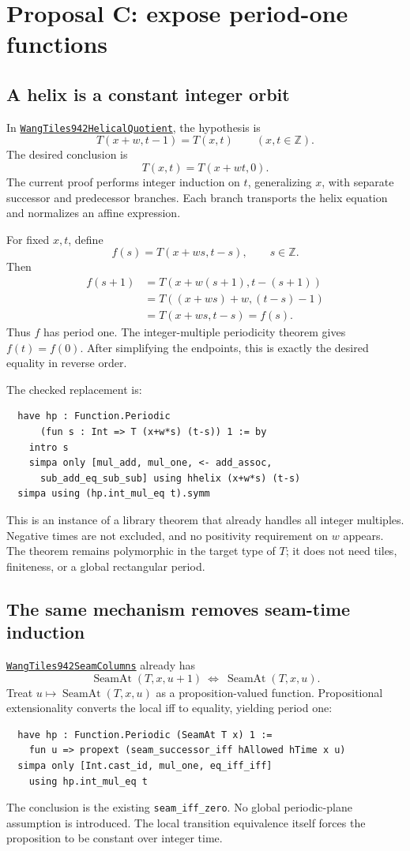 \documentclass[11pt,letterpaper]{article}
\newcommand{\code}[1]{\nolinkurl{#1}}
\newcommand{\src}[2]{\href{https://github.com/VladimirReshetnikov/ProveIt/blob/1e2a853935a6155cbcf2aa199aaca51946c4fff9/Computability/DiophantineConsistency/Lean/DiophantineConsistency/#1.lean}{\nolinkurl{#2}}}
\begin{document}
\section{Proposal C: expose period-one functions}
\subsection{A helix is a constant integer orbit}
In \src{WangTiles942HelicalQuotient}{WangTiles942HelicalQuotient}, the hypothesis is
\[
 T(x+w,t-1)=T(x,t)\qquad(x,t\in\mathbb Z).
\]
The desired conclusion is
\[
 T(x,t)=T(x+wt,0).
\]
The current proof performs integer induction on \(t\), generalizing \(x\), with separate successor and predecessor branches. Each branch transports the helix equation and normalizes an affine expression.

For fixed \(x,t\), define
\[
 f(s)=T(x+ws,t-s),\qquad s\in\mathbb Z.
\]
Then
\begin{align*}
 f(s+1)&=T(x+w(s+1),t-(s+1))\\
 &=T((x+ws)+w,(t-s)-1)\\
 &=T(x+ws,t-s)=f(s).
\end{align*}
Thus \(f\) has period one. The integer-multiple periodicity theorem gives \(f(t)=f(0)\). After simplifying the endpoints, this is exactly the desired equality in reverse order.

The checked replacement is:
\begin{lstlisting}
  have hp : Function.Periodic
      (fun s : Int => T (x+w*s) (t-s)) 1 := by
    intro s
    simpa only [mul_add, mul_one, <- add_assoc,
      sub_add_eq_sub_sub] using hhelix (x+w*s) (t-s)
  simpa using (hp.int_mul_eq t).symm
\end{lstlisting}
This is an instance of a library theorem that already handles all integer multiples. Negative times are not excluded, and no positivity requirement on \(w\) appears. The theorem remains polymorphic in the target type of \(T\); it does not need tiles, finiteness, or a global rectangular period.

\subsection{The same mechanism removes seam-time induction}
\src{WangTiles942SeamColumns}{WangTiles942SeamColumns} already has
\[
 \operatorname{SeamAt}(T,x,u+1)\ \Longleftrightarrow\ \operatorname{SeamAt}(T,x,u).
\]
Treat \(u\mapsto\operatorname{SeamAt}(T,x,u)\) as a proposition-valued function. Propositional extensionality converts the local iff to equality, yielding period one:
\begin{lstlisting}
  have hp : Function.Periodic (SeamAt T x) 1 :=
    fun u => propext (seam_successor_iff hAllowed hTime x u)
  simpa only [Int.cast_id, mul_one, eq_iff_iff]
    using hp.int_mul_eq t
\end{lstlisting}
The conclusion is the existing \code{seam_iff_zero}. No global periodic-plane assumption is introduced. The local transition equivalence itself forces the proposition to be constant over integer time.
\end{document}

